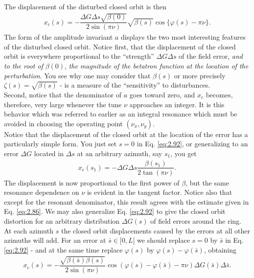 The displacement of the disturbed closed orbit is then
\begin{align}\label{eq:2.92}
	x_c(s) = -\dfrac{\Delta G \Delta s \sqrt{\beta(0)}}{2 \sin{(\pi\nu)}}\sqrt{\beta(s)}\cos\{\varphi(s)-\pi\nu\}.
\end{align}
The form of the amplitude invariant $a$ displays the two most interesting features of the disturbed closed orbit. Notice first, that the displacement of the closed orbit is everywhere
 proportional to the ``strength'' $\Delta G \Delta s$ of the field error, \emph{and to the root of} $\beta(0)$, \emph{the magnitude of the betatron function at the location of the perturbation}. You see why one may consider that $\beta(s)$ or more precisely $\zeta(s) = \sqrt{\beta(s)}$ - is a measure of the ``sensitivity'' to disturbances.\\
Second, notice that the denominator of $a$ goes toward zero, and $x_c$ becomes, therefore, very large whenever the tune $\nu$ approaches an integer. It is this behavior which was referred
 to earlier as an integral resonance which must be avoided in choosing the operating point $(\nu_x, \nu_y)$.\\
Notice that the displacement of the closed orbit at the location of the error has a particularly
 simple form. You just set $s = 0$ in Eq. \eqref{eq:2.92}, or generalizing to an error $\Delta G$ located in $\Delta s$ at an arbitrary azimuth, say $s_1$, you get
 \begin{align}
	x_c(s_1) = -\Delta G \Delta s \dfrac{\beta{(s_1)}}{2 \tan{(\pi\nu)}}.
\end{align}
The displacement is now proportional to the first power of $\beta$, but the same resonance
dependence on $\nu$ is evident in the tangent factor. Notice also that except for the resonant denominator, this result agrees with the estimate given in Eq. \eqref{eq:2.86}.
We may also generalize Eq. \eqref{eq:2.92} to give the closed orbit distortion for an
arbitrary distribution $\Delta G(s)$ of field errors around the ring. At each azimuth $s$ the closed orbit displacements caused by the errors at all other azimuths will add. For an error
 at $\bar{s} \in [0,L[$ we should replace $s = 0$ by $\bar{s}$ in Eq. \eqref{eq:2.92} - and at the same time replace $\varphi(s)$ by $\varphi(s) - \varphi(\bar{s})$, obtaining
\begin{align}\label{eq:dist_closed_orb}
x_c(s) = -\dfrac{\sqrt{\beta(\bar{s})\beta(s)}}{2\sin{(\pi\nu)}} \cos(\varphi(s)-\varphi(\bar{s})-\pi\nu)\Delta G(\bar{s})\Delta\bar{s}.
\end{align}
